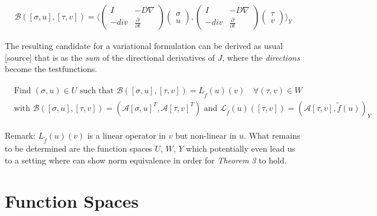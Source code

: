 \documentclass[../draft_1.tex]{subfiles}
\begin{document}
\begin{ceqn}
	\begin{equation}
	\begin{aligned}
	\mathcal{B} ([\sigma, u], [\tau, v]) = \langle \begin{pmatrix} 
	I & - D \nabla \\
	-div & \frac{\partial}{\partial t}
	\end{pmatrix} 
	\begin{pmatrix}
	\sigma \\
	u
	\end{pmatrix}, 
	\begin{pmatrix}
	I & - D \nabla \\
	-div & \frac{\partial}{\partial t}
	\end{pmatrix}
	\begin{pmatrix}
	\tau \\
	v
	\end{pmatrix} \rangle_Y
	\end{aligned}
	\end{equation}
\end{ceqn}
The resulting candidate for a variational formulation can be derived as usual [source] that is as the \textit{sum} of the directional derivatives of $J$, where the \textit{directions} become the testfunctions.

\begin{ceqn}
	\begin{align}
	\begin{aligned}
	\text{ Find } (\sigma, u) \in U \text{ such that } \mathcal{B} ([\sigma, u], [\tau, v]) = L_{\tilde{f}}(u)(v) \quad \forall (\tau, v) \in W \\
 \text{ with } \mathcal{B} ([\sigma, u], [\tau, v]) = (\mathcal{A} [\sigma, u]^T,  \mathcal{A} [\tau, v]^T) \text{ and } \mathcal{L}_{\tilde{f}}(u)([\tau,v]) = (\mathcal{A}[\tau,v], \tilde{f}(u))_Y
\end{aligned}
	\end{align}
\end{ceqn}
Remark: $L_{\tilde{f}}(u)(v)$ is a linear operator in $v$ but non-linear in $u$. 
What remains to be determined are the function spaces $U$, $W$, $Y$ which potentially even lead us to a setting where can show norm equivalence in order for \textit{Theorem 3} to hold.

\section{Function Spaces}
\end{document}
